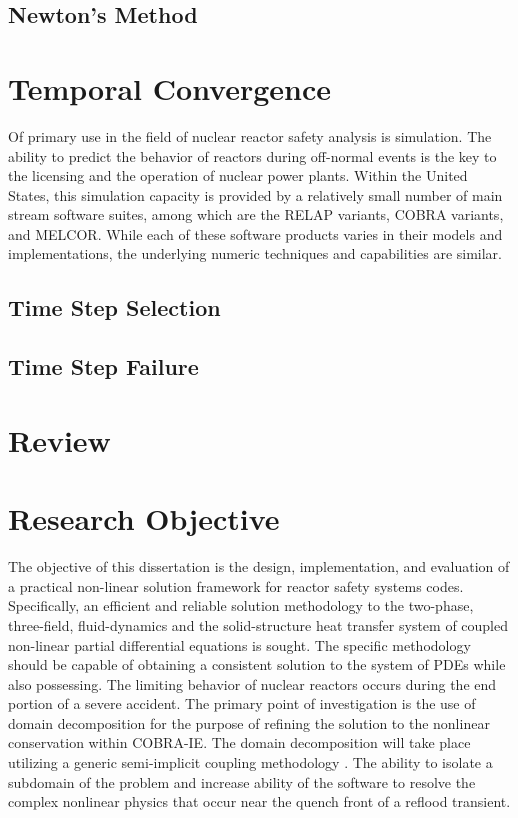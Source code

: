 \subsection{Newton's Method}
\label{subsect:newtons_method}


\section{Temporal Convergence}
\label{sect:temporal_convergence}
Of primary use in the field of nuclear reactor safety analysis is simulation.
The ability to predict the behavior of reactors during off-normal events is the key to the licensing and the operation of nuclear power plants.
Within the United States, this simulation capacity is provided by a relatively small number of main stream software suites, among which are the RELAP variants, COBRA variants, and MELCOR.
While each of these software products varies in their models and implementations, the underlying numeric techniques and capabilities are similar.

\subsection{Time Step Selection}
\label{subsect:time_step_selection}


\subsection{Time Step Failure}
\label{subsect:time_step_failure}

\section{Review}
\label{sect:review}

\section{Research Objective}
The objective of this dissertation is the design, implementation, and evaluation of a practical non-linear solution framework for reactor safety systems codes.
Specifically, an efficient and reliable solution methodology to the two-phase, three-field, fluid-dynamics and the solid-structure heat transfer system of coupled non-linear partial differential equations is sought.
The specific methodology should be capable of obtaining a consistent solution to the system of PDEs while also possessing. \cite{Aktas1996}
The limiting behavior of nuclear reactors occurs during the end portion of a severe accident.
The primary point of investigation is the use of domain decomposition for the purpose of refining the solution to the nonlinear conservation within COBRA-IE.
The domain decomposition will take place utilizing a generic semi-implicit coupling methodology \cite{Weaver2002}.
The ability to isolate a subdomain of the problem and increase ability of the software to resolve the complex nonlinear physics that occur near the quench front of a reflood transient.